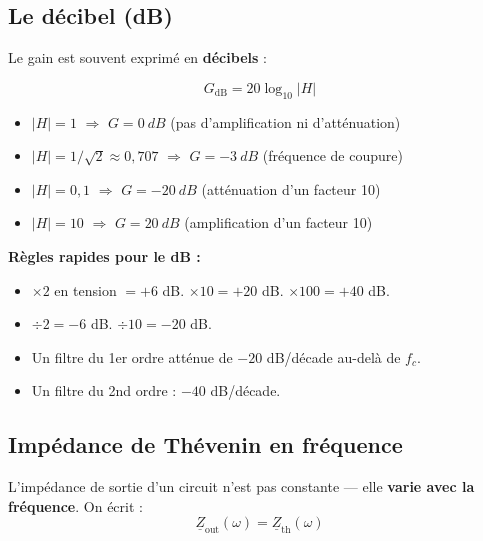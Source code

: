 \documentclass[12pt,a4paper,twoside]{book}
\begin{document}
\subsection{Le décibel (dB)}

Le gain est souvent exprimé en \textbf{décibels} :

\begin{formule}
\[
\boxed{G_{\text{dB}} = 20\log_{10}|H|}
\]
\begin{itemize}[nosep]
\item $|H| = 1$ $\Rightarrow$ $G = \SI{0}{dB}$ (pas d'amplification ni d'atténuation)
\item $|H| = 1/\sqrt{2} \approx 0{,}707$ $\Rightarrow$ $G = \SI{-3}{dB}$ (fréquence de coupure)
\item $|H| = 0{,}1$ $\Rightarrow$ $G = \SI{-20}{dB}$ (atténuation d'un facteur 10)
\item $|H| = 10$ $\Rightarrow$ $G = \SI{+20}{dB}$ (amplification d'un facteur 10)
\end{itemize}
\end{formule}

\begin{pratique}
\textbf{Règles rapides pour le dB :}
\begin{itemize}[nosep]
\item $\times 2$ en tension $= +6$ dB. $\times 10 = +20$ dB. $\times 100 = +40$ dB.
\item $\div 2 = -6$ dB. $\div 10 = -20$ dB.
\item Un filtre du 1er ordre atténue de $-20$ dB/décade au-delà de $f_c$.
\item Un filtre du 2nd ordre : $-40$ dB/décade.
\end{itemize}
\end{pratique}

\subsection{Impédance de Thévenin en fréquence}

L'impédance de sortie d'un circuit n'est pas constante --- elle \textbf{varie avec la fréquence}. On écrit :
\[
\underline{Z}_{\text{out}}(\omega) = \underline{Z}_{\text{th}}(\omega)
\]
\end{document}
